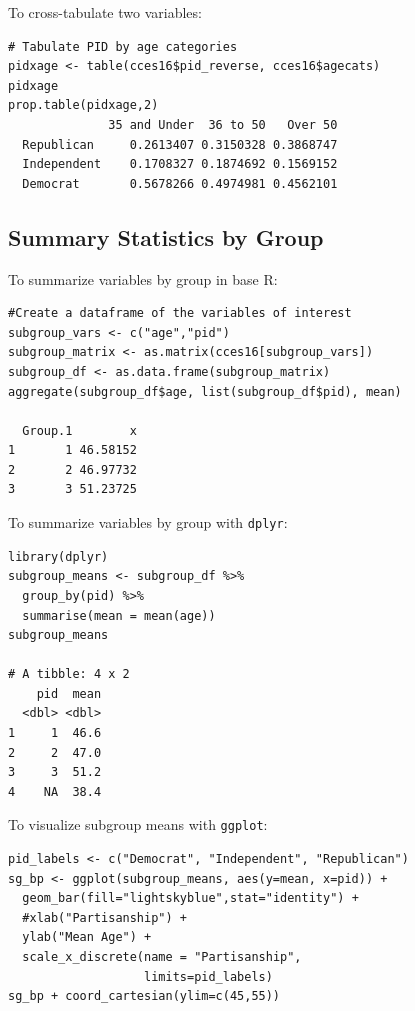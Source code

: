 \documentclass[12pt, letterpaper,notitlepage]{article}
\begin{document}
To cross-tabulate two variables:
\begin{lstlisting}
# Tabulate PID by age categories
pidxage <- table(cces16$pid_reverse, cces16$agecats)
pidxage
prop.table(pidxage,2)
              35 and Under  36 to 50   Over 50
  Republican     0.2613407 0.3150328 0.3868747
  Independent    0.1708327 0.1874692 0.1569152
  Democrat       0.5678266 0.4974981 0.4562101
\end{lstlisting}

\newpage
\subsection{Summary Statistics by Group}
To summarize variables by group in base R:

\begin{lstlisting}
#Create a dataframe of the variables of interest
subgroup_vars <- c("age","pid")
subgroup_matrix <- as.matrix(cces16[subgroup_vars])
subgroup_df <- as.data.frame(subgroup_matrix)
aggregate(subgroup_df$age, list(subgroup_df$pid), mean)

  Group.1        x
1       1 46.58152
2       2 46.97732
3       3 51.23725
\end{lstlisting}

To summarize variables by group with \texttt{dplyr}:

\begin{lstlisting}
library(dplyr)
subgroup_means <- subgroup_df %>%
  group_by(pid) %>%
  summarise(mean = mean(age))
subgroup_means

# A tibble: 4 x 2
    pid  mean
  <dbl> <dbl>
1     1  46.6
2     2  47.0
3     3  51.2
4    NA  38.4
\end{lstlisting}

\newpage

To visualize subgroup means with \texttt{ggplot}:

\begin{lstlisting}
pid_labels <- c("Democrat", "Independent", "Republican")
sg_bp <- ggplot(subgroup_means, aes(y=mean, x=pid)) + 
  geom_bar(fill="lightskyblue",stat="identity") +
  #xlab("Partisanship") +
  ylab("Mean Age") +
  scale_x_discrete(name = "Partisanship",
                   limits=pid_labels)
sg_bp + coord_cartesian(ylim=c(45,55))
\end{lstlisting}
\end{document}
